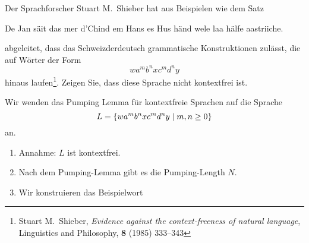 Der Sprachforscher Stuart M.~Shieber hat aus Beispielen wie dem Satz
\begin{center}
De Jan säit das mer d'Chind em Hans es Hus händ wele laa hälfe aastriiche.
\end{center}
abgeleitet, dass das Schweizderdeutsch grammatische Konstruktionen
zulässt, die auf Wörter der Form
\[
wa^mb^nxc^md^ny
\]
hinaus laufen\footnote{Stuart M.~Shieber,
{\em Evidence against the context-freeness of natural language},
Linguistics and Philosophy, {\bf 8} (1985) 333--343}.
Zeigen Sie, dass diese Sprache nicht kontextfrei ist.


\begin{loesung}
Wir wenden das Pumping Lemma für kontextfreie Sprachen auf die Sprache
\[
L=\{
wa\mathstrut^mb\mathstrut^nxc\mathstrut^md\mathstrut^ny
\;|\; m,n\ge 0
\}
\]
an.
\begin{enumerate}
\item Annahme: $L$ ist kontextfrei.
\item Nach dem Pumping-Lemma gibt es die Pumping-Length $N$.
\item Wir konstruieren das Beispielwort
\begin{center}
\end{center}
\end{enumerate}
\end{loesung}
